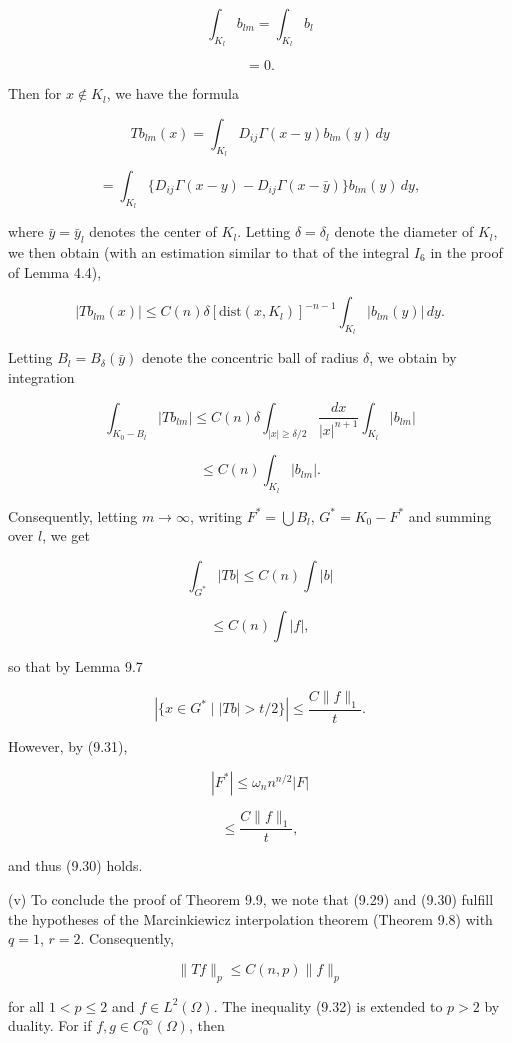 \[
\int_{K_l} b_{lm} = \int_{K_l} b_l
\]

\[
= 0.
\]

Then for $x \notin K_l$, we have the formula

\[
Tb_{lm}(x) = \int_{K_l} D_{ij}\Gamma(x-y)b_{lm}(y)\,dy
\]

\[
= \int_{K_l} \{D_{ij}\Gamma(x-y)-D_{ij}\Gamma(x-\bar y)\}b_{lm}(y)\,dy,
\]

where $\bar y = \bar y_l$ denotes the center of $K_l$. Letting $\delta = \delta_l$ denote the diameter of $K_l$, we
then obtain (with an estimation similar to that of the integral $I_6$ in the proof of
Lemma 4.4),

\[
|Tb_{lm}(x)| \le C(n)\delta[\mathrm{dist}(x,K_l)]^{-n-1}\int_{K_l}|b_{lm}(y)|\,dy.
\]

Letting $B_l = B_{\delta}(\bar y)$ denote the concentric ball of radius $\delta$, we obtain by integration

\[
\int_{K_0 - B_l} |Tb_{lm}| \le C(n)\delta \int_{|x|\ge \delta/2}\frac{dx}{|x|^{n+1}}\int_{K_l}|b_{lm}|
\]

\[
\le C(n)\int_{K_l}|b_{lm}|.
\]



Consequently, letting $m \to \infty$, writing $F^* = \bigcup B_l$, $G^* = K_0 - F^*$ and summing
over $l$, we get

\[
\int_{G^*} |Tb| \le C(n) \int |b|
\]

\[
\le C(n) \int |f|,
\]

so that by Lemma 9.7

\[
\left|\{x \in G^* \mid |Tb| > t/2\}\right| \le \frac{C\|f\|_1}{t}.
\]

However, by (9.31),

\[
|F^*| \le \omega_n n^{n/2}|F|
\]

\[
\le \frac{C\|f\|_1}{t},
\]

and thus (9.30) holds.

\noindent (v) To conclude the proof of Theorem 9.9, we note that (9.29) and (9.30)
fulfill the hypotheses of the Marcinkiewicz interpolation theorem (Theorem 9.8)
with $q = 1$, $r = 2$. Consequently,

\begin{equation}
\|Tf\|_p \le C(n, p)\|f\|_p
\tag{9.32}
\end{equation}

for all $1 < p \le 2$ and $f \in L^2(\Omega)$. The inequality (9.32) is extended to $p > 2$ by
duality. For if $f, g \in C_0^{\infty}(\Omega)$, then

